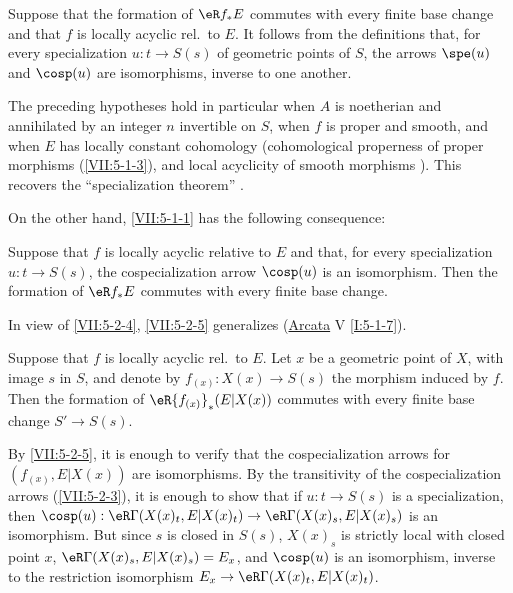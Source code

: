 Suppose that the formation of $\eR f_\ast E$ commutes with every finite base
change and that $f$ is locally acyclic rel.\ to $E$. It follows from the
definitions that, for every specialization $u:t\to S(s)$ of geometric points
of $S$, the arrows $\spe(u)$ and $\cosp(u)$ are isomorphisms, inverse to one
another.

The preceding hypotheses hold in particular when $A$ is noetherian and
annihilated by an integer $n$ invertible on $S$, when $f$ is proper and smooth,
and when $E$ has locally constant cohomology (cohomological properness of
proper morphisms (\ref{VII:5-1-3}), and local acyclicity of smooth morphisms
\cite[XV]{sga4}). This recovers the ``specialization theorem''
\cite[XVI 2.1]{sga4}.

On the other hand, \ref{VII:5-1-1} has the following consequence:






\begin{proposition}\label{VII:5-2-5}
Suppose that $f$ is locally acyclic relative to $E$ and that, for every
specialization $u:t\to S(s)$, the cospecialization arrow $\cosp(u)$ is an
isomorphism. Then the formation of $\eR f_\ast E$ commutes with every finite
base change.
\end{proposition}

In view of \ref{VII:5-2-4}, \ref{VII:5-2-5} generalizes
(\hyperref[I]{Arcata} V \ref{I:5-1-7}).






\begin{corollary}\label{VII:5-2-6}
Suppose that $f$ is locally acyclic rel.\ to $E$. Let $x$ be a geometric
point of $X$, with image $s$ in $S$, and denote by
$f_{(x)}:X(x)\to S(s)$ the morphism induced by $f$. Then the formation of
$\eR {f_{(x)}}_\ast(E|X(x))$ commutes with every finite base change
$S'\to S(s)$.
\end{corollary}

By \ref{VII:5-2-5}, it is enough to verify that the cospecialization arrows
for $(f_{(x)},E|X(x))$ are isomorphisms. By the transitivity of the
cospecialization arrows (\ref{VII:5-2-3}), it is enough to show that if
$u:t\to S(s)$ is a specialization, then
$\cosp(u):\eR\Gamma(X(x)_t,E|X(x)_t)\to \eR\Gamma(X(x)_s,E|X(x)_s)$ is an
isomorphism. But since $s$ is closed in $S(s)$, $X(x)_s$ is strictly local
with closed point $x$, $\eR\Gamma(X(x)_s,E|X(x)_s)=E_x$, and $\cosp(u)$ is an
isomorphism, inverse to the restriction isomorphism
$E_x\to \eR\Gamma(X(x)_t,E|X(x)_t)$.






